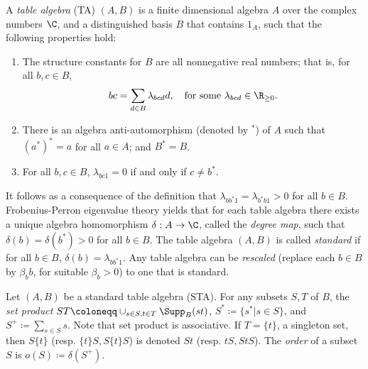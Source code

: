  
\begin{defi}

\label{def:TA}
A \emph{table algebra} (TA) $(A, B)$ is a finite dimensional
algebra $A$
over the complex numbers $\C$, and a distinguished basis $B$ that
contains $1_A$, such that the following properties hold:
\begin{enumerate}[label=(1\alph*)]
\item\label{defi1.1_1a} %
The structure constants for $B$ are all nonnegative real numbers; that is, for all
$b,c \in B$,
\[
bc = \sum_{d \in B} \lambda_{bcd}d, \quad \text{for some }
\lambda_{bcd} \in \R_{\geq 0}.
\]
\item\label{defi1.1_1b} %
There is an algebra anti-automorphism (denoted by $^*$) of $A$ such
that $(a^*)^* = a$ for all $a \in A$; and $B^* = B$.
\item\label{defi1.1_1c} %
For all $b,c \in B$, 
$\lambda_{bc1} = 0$ if and only if $c \neq b^*$. 
\end{enumerate}
\end{defi}


It follows as a consequence of the definition that $\lambda_{bb^*1} =
\lambda_{b^*b1} > 0$ for all $b \in B$. Frobenius-Perron eigenvalue
theory yields that for each table algebra there exists a unique algebra
homomorphism $\delta: A \rightarrow {\C}$, called the \emph{degree map},
such that $\delta(b) = \delta(b^*) > 0$ for all $b \in B$. The table
algebra $(A, B)$ is called \emph{standard} if for all $b \in B$,
$\delta(b) = \lambda_{bb^*1}$. Any table algebra can be \emph{rescaled}
(replace each $b \in B$ by $\beta_bb$, for suitable $\beta_b > 0$) to
one that is standard.


Let $(A, B)$ be a standard table algebra (STA). For any subsets $S, T$
of $B$, the \emph{set product} $ST \coloneqq \cup_{s\in S, t\in
T}\Supp _B(st)$, $S^* \coloneqq \{s^* | s \in S\}$, and $S^+ \coloneqq \sum_{s
\in S}s$. Note that set product is associative. If $T = \{t\}$, a
singleton set, then $S\{t\}$ (resp. $\{t\}S, S\{t\}S$) is denoted $St$
(resp. $tS, StS$). The \emph{order} of a subset $S$ is $o(S) \coloneqq \delta
(S^+)$.

